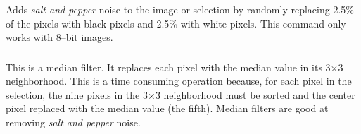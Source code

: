\subsubsection{\protect{}\label{sub:Salt-and-Pepper}}

Adds \emph{salt and pepper} noise to the image or selection by randomly
replacing 2.5\% of the pixels with black pixels and 2.5\% with white
pixels. This command only works with 8--bit images.




\subsubsection[\protect\userinterface{Despeckle}]{\protect{}\label{sub:Despeckle}}

This is a median filter. It replaces each pixel with the median value
in its 3$\times$3 neighborhood. This is a time consuming operation
because, for each pixel in the selection, the nine pixels in the 3$\times$3
neighborhood must be sorted and the center pixel replaced with the
median value (the fifth). Median filters are good at removing \emph{salt
and pepper }noise. 


\subsubsection[\protect\userinterface{Remove Outliers\ldots{}}]{\protect{}\label{sub:Remove-Outliers...}}

